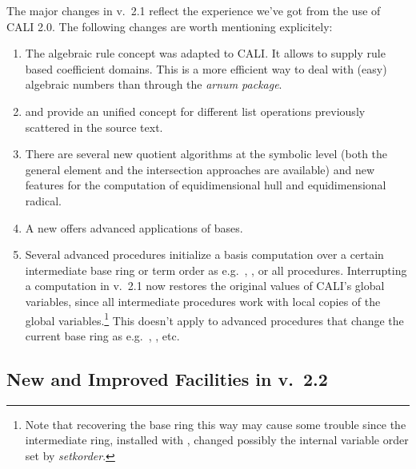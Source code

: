 The major changes in v.\ 2.1 reflect the experience we've got from the
use of CALI 2.0. The following changes are worth mentioning
explicitely:
\begin{enumerate}
\item The algebraic rule concept was adapted to CALI. It allows to
supply rule based coefficient domains. This is a more efficient way
to deal with (easy) algebraic numbers than through the {\em arnum
package}.

\item {} and  provide an unified
concept for different list operations previously scattered in the
source text.

\item There are several new quotient algorithms at the symbolic level
(both the general element and the intersection approaches are
available) and new features for the computation of equidimensional
hull and equidimensional radical.

\item A new  offers advanced applications of \gr
bases.

\item Several advanced procedures initialize a \gr basis computation
over a certain intermediate base ring or term order as e.g.\
, ,  or all
 procedures. Interrupting a computation in
v.\ 2.1 now restores the original values of CALI's global variables,
since all intermediate procedures work with local copies of
the global variables.\footnote{Note that recovering the base
ring this way may cause some trouble since the intermediate ring,
installed with \ind{setring}, changed possibly the internal variable
order set by {\em setkorder}.} This doesn't apply to advanced
procedures that change the current base ring as e.g.\ ,
\ind{preimage}, \ind{sym} etc.

\end{enumerate}

\subsection{New and Improved Facilities in v.\ 2.2}

